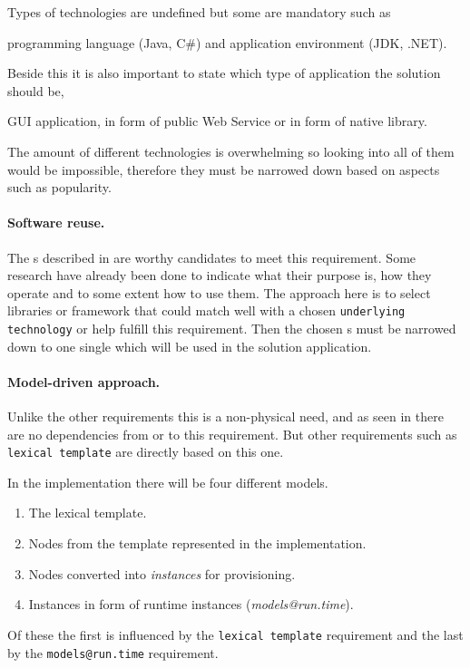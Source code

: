 Types of technologies are undefined but some are mandatory such as 
\begin{ii}
  \iitem programming language (Java, C\#) and 
  \iitem application environment (JDK, .NET).
\end{ii}
Beside this it is also important to state which type of application the solution should be, 
\begin{ii}
  \iitem GUI application,
  \iitem {} in form of public Web Service or
  \iitem {} in form of native library.
\end{ii}
The amount of different technologies is overwhelming so looking into all of them would be impossible,
therefore they must be narrowed down based on aspects such as popularity.

\paragraph{Software reuse.}

The s described in  are worthy candidates to meet this requirement.
Some research have already been done to indicate what their purpose is, 
how they operate and to some extent how to use them.
The approach here is to select libraries or framework that could match well with a chosen
\texttt{underlying technology} or help fulfill this requirement.
Then the chosen s must be narrowed down to one single  which will be
used in the solution application.

\paragraph{Model-driven approach.}

Unlike the other requirements this is a non-physical need, 
and as seen in 
there are no dependencies from or to this requirement.
But other requirements such as \texttt{lexical template} are directly based on this one.

In the implementation there will be four different models.
\begin{enumerate}
  \item The lexical template.
  \item Nodes from the template represented in the implementation.
  \item Nodes converted into \emph{instances} for provisioning.
  \item Instances in form of runtime instances (\emph{models@run.time}).
\end{enumerate}
Of these the first is influenced by the \texttt{lexical template} requirement and
the last by the \texttt{models@run.time} requirement.

